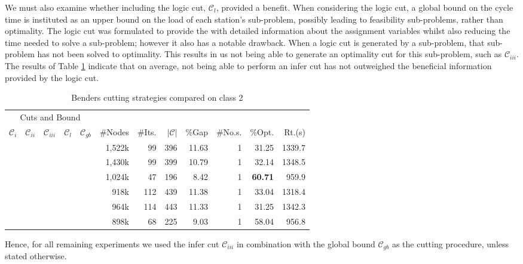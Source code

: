 We must also examine whether including the logic cut, $\mathcal{C}_{l}$,
provided a benefit.
When considering the logic cut, a global bound on the cycle time is instituted
as an upper bound on the load of each station's sub-problem,
possibly leading to feasibility sub-problems, rather than optimality.
The logic cut was formulated to provide the \rmp{} with detailed information
about the assignment variables whilst also reducing the time
needed to solve a sub-problem; however it also has a notable drawback.
When a logic cut is generated by a sub-problem, that sub-problem
has not been solved to optimality.
This results in us not being able to generate an optimality cut for
this sub-problem, such as $\mathcal{C}_{iii}$.
The results of Table \ref{tab:exp:resultsCutsClass2} indicate
that on average, not being able to perform an infer cut has not outweighed the beneficial
information provided by the logic cut.

\begin{table}[tpb]
	\caption{Benders cutting strategies compared on class 2}
	\centering
	\vspace{2mm}
	\begin{tabular}{cccccrrrrrrr}
		\toprule
		\multicolumn{5}{c}{Cuts and Bound}  &  &  &  &  &  &  &   \\\cmidrule(rl){1-5}
		$\mathcal{C}_{i}$ & $\mathcal{C}_{ii}$ & $\mathcal{C}_{iii}$ & $\mathcal{C}_{l}$ & $\mathcal{C}_{gb}$ & \#Nodes & \#Its. & $|\mathcal{C}|$ & \%Gap & \#No.s. & \%Opt. & Rt.(s) \\\midrule\midrule
		\checkmark &  &  &  & \checkmark & 1,522k & 99 & 396 & 11.63 & 1 & 31.25 & 1339.7 \\
		 & \checkmark &  &  & \checkmark & 1,430k & 99 & 399 & 10.79 & 1 & 32.14 & 1348.5 \\
		 &  & \checkmark &  & \checkmark & 1,024k & 47 & 196 & 8.42 & 1 & \bf{60.71} & 959.9 \\\midrule
		\checkmark &  &  & \checkmark & \checkmark & 918k & 112 & 439 & 11.38 & 1 & 33.04 & 1318.4 \\
		 & \checkmark &  & \checkmark & \checkmark & 964k & 114 & 443 & 11.33 & 1 & 31.25 & 1342.3 \\
		 &  & \checkmark & \checkmark & \checkmark & 898k & 68 & 225 & 9.03 & 1 & 58.04 & 956.8 \\
		\bottomrule
	\end{tabular}
	\label{tab:exp:resultsCutsClass2}
\end{table}

Hence, for all remaining experiments we used the infer cut $\mathcal{C}_{iii}$
in combination with the global bound $\mathcal{C}_{gb}$ as the cutting
procedure, unless stated otherwise.

